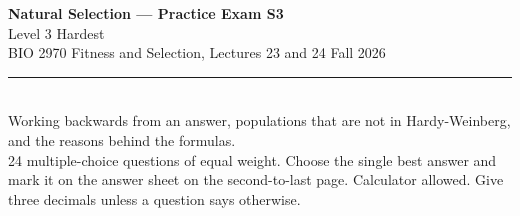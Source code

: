 \documentclass[11pt]{article}
\begin{document}
\begin{center}
  {\LARGE\bfseries Natural Selection --- Practice Exam S3}\\[5pt]
  {\large Level 3 \quad\textbullet\quad Hardest}\\[6pt]
  BIO 2970 \quad\textbullet\quad Fitness and Selection, Lectures 23 and 24 \quad\textbullet\quad Fall 2026\\[3pt]
  \rule{\textwidth}{0.8pt}\\[3pt]
  {\small Working backwards from an answer, populations that are not in Hardy-Weinberg, and the reasons behind the formulas.\\[2pt] 24 multiple-choice questions of equal weight. Choose the single best answer and mark it on the answer sheet on the second-to-last page. Calculator allowed. Give three decimals unless a question says otherwise.}
\end{center}
\vspace{0.4em}
\end{document}
